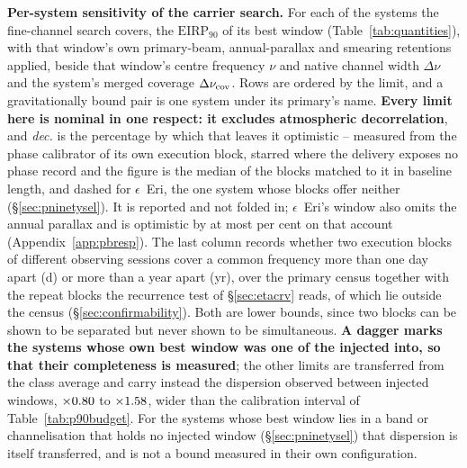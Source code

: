 \begin{table}
\centering
\caption{\textbf{Per-system sensitivity of the carrier search.} For each of
the \NSysClassA{} systems the fine-channel search covers, the
$\mathrm{EIRP}_{90}$ of its best window (Table~\ref{tab:quantities}), with
that window's own primary-beam, annual-parallax and smearing retentions
applied, beside that window's centre frequency $\nu$ and native channel
width $\Delta\nu$ and the system's merged coverage $\Delta\nu_{\rm cov}$.
Rows are ordered by the limit, and a gravitationally bound pair is one
system under its primary's name.
\textbf{Every limit here is nominal in one respect: it excludes atmospheric
decorrelation}, and \emph{dec.} is the percentage by which that leaves it
optimistic -- measured from the phase calibrator of its own execution block,
starred where the delivery exposes no phase record and the figure is the
median of the blocks matched to it in baseline length, and dashed for
$\epsilon$~Eri, the one system whose blocks offer neither
(\S\ref{sec:pninetysel}). It is reported and not folded in;
$\epsilon$~Eri's window also omits the annual parallax and is optimistic by
at most \BmEpsPxBoundPct{} per cent on that account
(Appendix~\ref{app:pbresp}).
The last column records whether two execution blocks of different observing
sessions cover a common frequency more than one day apart (d) or more than a
year apart (yr), over the primary census together with the \ZcNRecEB{}
repeat blocks the recurrence test of \S\ref{sec:etacrv} reads, of which
\ZcNRecEBOut{} lie outside the census (\S\ref{sec:confirmability}). Both are
lower bounds, since two blocks can be shown to be separated but never shown
to be simultaneous.
\textbf{A dagger marks the \SmcNMeasSys{} systems whose own best window was
one of the \SensNInj{} injected into, so that their completeness is
measured}; the other \SmcNEstSys{} limits are transferred from the class
average and carry instead the dispersion observed between injected windows,
$\times\SmcDispLo$ to $\times\SmcDispHi$, wider than the calibration
interval of Table~\ref{tab:p90budget}. For the \NgNExtrapSys{} systems whose
best window lies in a band or channelisation that holds no injected window
(\S\ref{sec:pninetysel}) that dispersion is itself transferred, and is not a
bound measured in their own configuration.}
\label{tab:persys}
\footnotesize

\end{table}
